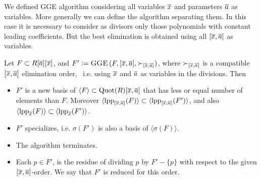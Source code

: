 We defined {\sc GGE} algorithm considering all variables $\overline{x}$ and
parameters $\overline{a}$ as variables. More generally we can define the
algorithm separating them. In this case it is necessary to
consider as divisors only those polynomials with constant leading
coefficients. But the best elimination is obtained using all
$[\overline{x},\overline{a}]$ as variables.

\begin{prop} \label{ggex}
 Let $F \subset R[\overline{a}][\overline{x}]$, and $F':=\hbox{\sc GGE}\,(F,[\overline{x},\overline{a}],\succ_{[\overline{x},\overline{a}]})$,
 where $\succ_{[\overline{x},\overline{a}]}$ is a compatible $[\overline{x},\overline{a}]$ elimination
 order,
 \ i.e. using $\overline{x}$ and $\overline{a}$ as variables in the divisions. Then
 \begin{itemize}
 \item[{\rm (i)}] $F'$ is a new basis of $\langle F \rangle \subset
 \hbox{\rm Quot}(R)[\overline{x},\overline{a}]$ that has less or equal number of elements than
 $F$. Moreover $\langle \hbox{\rm lpp}_{[\overline{x},\overline{a}]}(F) \rangle \subset
 \langle \hbox{\rm lpp}_{[\overline{x},\overline{a}]}(F') \rangle$, and also
 $\langle \hbox{\rm lpp}_{\overline{x}}(F) \rangle \subset
 \langle \hbox{\rm lpp}_{\overline{x}}(F') \rangle$.
 \item[{\rm (ii)}] $F'$ specializes, i.e. $\sigma(F')$ is also a basis of $\langle
 \sigma(F) \rangle $.
 \item[{\rm (iii)}] The algorithm terminates.
 \item[{\rm (iv)}] Each $p \in F'$, is the residue of dividing $p$ by
 $F' - \{p\}$ with respect to the given $[\overline{x},\overline{a}]$-order. We
 say that $F'$ is reduced for this order.
 \end{itemize}
\end{prop}

